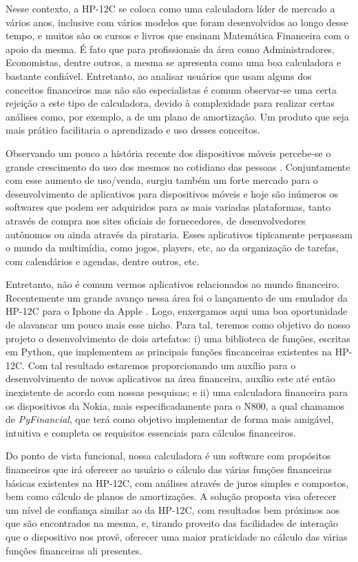 Nesse contexto, a HP-12C \cite{hp12c} se coloca como uma calculadora líder de mercado a vários anos, inclusive com vários modelos que foram desenvolvidos ao longo desse tempo, e muitos são os cursos e livros que ensinam Matemática Financeira com o apoio da mesma. É fato que para profissionais da área como Administradores, Economistas, dentre outros, a mesma se apresenta como uma boa calculadora e bastante confiável. Entretanto, ao analisar usuários que usam alguns dos conceitos financeiros mas não são especialistas é comum observar-se uma certa rejeição a este tipo de calculadora, devido à complexidade para realizar certas análises como, por exemplo, a de um plano de amortização. Um produto que seja mais prático facilitaria o aprendizado e uso desses conceitos.

Observando um pouco a história recente dos dispositivos móveis percebe-se o grande crescimento do uso dos mesmos no cotidiano das pessoas \cite{celular}. Conjuntamente com esse aumento de uso/venda, surgiu também um forte mercado para o desenvolvimento de aplicativos para dispositivos móveis e hoje são inúmeros os softwares que podem ser adquiridos para as mais variadas plataformas, tanto através de compra nos sites oficiais de fornecedores, de desenvolvedores autônomos ou ainda através da pirataria. Esses aplicativos tipicamente perpassam o mundo da multimídia, como jogos, players, etc, ao da organização de tarefas, com calendários e agendas, dentre outros, etc.

Entretanto, não é comum vermos aplicativos relacionados ao mundo financeiro. Recentemente um grande avanço nessa área foi o lançamento de um emulador da HP-12C para o Iphone da Apple \cite{iphone}. Logo, enxergamos aqui uma boa oportunidade de alavancar um pouco mais esse nicho. Para tal, teremos como objetivo do nosso projeto o desenvolvimento de dois artefatos: i) uma biblioteca de funções, escritas em Python, que implementem as principais funções fincanceiras existentes na HP-12C. Com tal resultado estaremos proporcionando um auxílio para o desenvolvimento de novos aplicativos na área financeira, auxílio este até então inexistente de acordo com nossas pesquisas; e ii) uma calculadora financeira para os dispositivos da Nokia, mais especificadamente para o N800, a qual chamamos de \textit{PyFinancial}, que terá como objetivo implementar de forma mais amigável, intuitiva e completa os requisitos essenciais para cálculos financeiros. 

Do ponto de vista funcional, nossa calculadora é um software com propósitos financeiros que irá oferecer ao usuário o cálculo das várias funções financeiras básicas existentes na HP-12C, com análises através de juros simples e compostos, bem como cálculo de planos de amortizações.  A solução proposta visa oferecer um nível de confiança similar ao da HP-12C, com resultados bem próximos aos que são encontrados na mesma, e, tirando proveito das facilidades de interação que o dispositivo nos provê, oferecer uma maior praticidade no cálculo das várias funções financeiras ali presentes.


